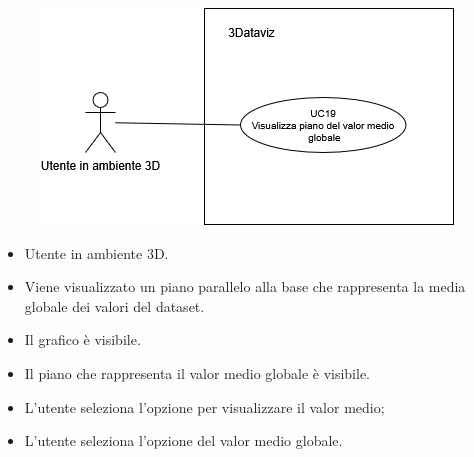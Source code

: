 \begin{figure}[H]\centering
    \includegraphics[scale=0.7]{template/images/UC19.png}
    \caption{}
\end{figure}
\UCdsc
{ %
    \begin{itemize}
        \item Utente in ambiente 3D.
    \end{itemize}
}
{ %
    \begin{itemize}
        \item Viene visualizzato un piano parallelo alla base che rappresenta la media globale dei valori del dataset.
    \end{itemize}
}
{ %
    \begin{itemize}
        \item Il grafico è visibile.
    \end{itemize}
}
{ %
    \begin{itemize}
        \item Il piano che rappresenta il valor medio globale è visibile.
    \end{itemize}
}
{ %
    \begin{itemize}
        \item L'utente seleziona l'opzione per visualizzare il valor medio;
        \item L'utente seleziona l'opzione del valor medio globale.
    \end{itemize}
}